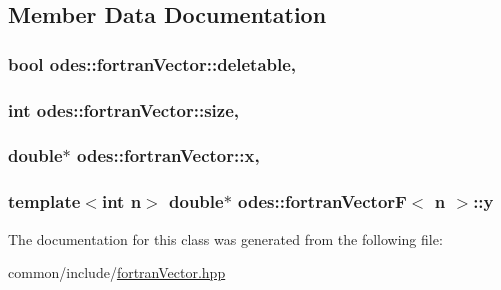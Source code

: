 \subsection{Member Data Documentation}
\hypertarget{classodes_1_1fortranVector_ace9b5d1e721b6f82ed090350181557b6}{
\subsubsection[{deletable}]{\setlength{\rightskip}{0pt plus 5cm}bool odes\-::fortran\-Vector\-::deletable\hspace{0.3cm}{\ttfamily [protected]}, {\ttfamily [inherited]}}}\label{classodes_1_1fortranVector_ace9b5d1e721b6f82ed090350181557b6}
\hypertarget{classodes_1_1fortranVector_a4734531bec0ccbaf24f22c12969580db}{
\subsubsection[{size}]{\setlength{\rightskip}{0pt plus 5cm}int odes\-::fortran\-Vector\-::size\hspace{0.3cm}{\ttfamily [protected]}, {\ttfamily [inherited]}}}\label{classodes_1_1fortranVector_a4734531bec0ccbaf24f22c12969580db}
\hypertarget{classodes_1_1fortranVector_aa92f26c38f887fca314d4e031b5ebe29}{
\subsubsection[{x}]{\setlength{\rightskip}{0pt plus 5cm}double$\ast$ odes\-::fortran\-Vector\-::x\hspace{0.3cm}{\ttfamily [protected]}, {\ttfamily [inherited]}}}\label{classodes_1_1fortranVector_aa92f26c38f887fca314d4e031b5ebe29}
\hypertarget{classodes_1_1fortranVectorF_ab63c07846aaec65436dddf3b8f55ae22}{
\subsubsection[{y}]{\setlength{\rightskip}{0pt plus 5cm}template$<$int n$>$ double$\ast$ {\bf odes\-::fortran\-Vector\-F}$<$ n $>$\-::y\hspace{0.3cm}{\ttfamily [private]}}}\label{classodes_1_1fortranVectorF_ab63c07846aaec65436dddf3b8f55ae22}


The documentation for this class was generated from the following file\-:\begin{DoxyCompactItemize}
\item 
common/include/\hyperlink{fortranVector_8hpp}{fortran\-Vector.\-hpp}\end{DoxyCompactItemize}
